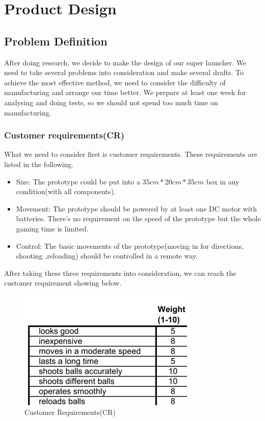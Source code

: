 \documentclass{article}
\begin{document}
\section{Product Design}
\subsection{Problem Definition}
After doing research, we decide to make the design of our super launcher. We need to take several problems into consideration and make several drafts. To achieve the most effective method, we need to consider the difficulty of manufacturing and arrange our time better. We prepare at least one week for analysing and doing tests, so we should not spend too much time on manufacturing.
\subsubsection{Customer requirements(CR)}
What we need to consider first is customer requirements. These requirements are listed in the following.
\begin{itemize}
\item Size: The prototype could be put into a $35cm*20cm*35cm$ box in any condition(with all components).
\item Movement: The prototype should be powered by at least one DC motor with batteries. There's no requirement on the speed of the prototype but the whole gaming time is limited.
\item Control: The basic movements of the prototype(moving in for directions, shooting ,reloading) should be controlled in a remote way.
\end{itemize}

After taking these three requirements into consideration, we can reach the customer requirement showing below.

\begin{figure}[H]
\centering
\includegraphics[width=0.5\linewidth]{cr}
\caption{Customer Requirements(CR)}
\end{figure}
\end{document}

